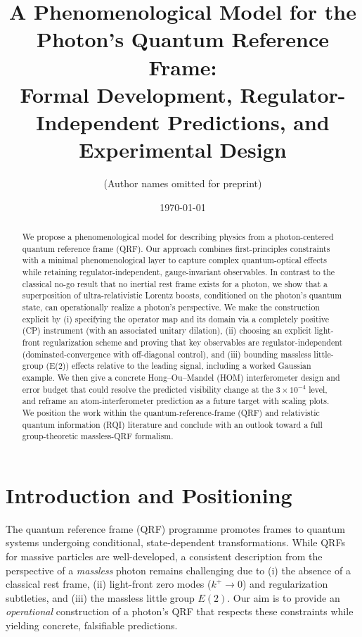 \documentclass[aps,11pt]{article}
\newcommand{\kplus}{k^{+}}
\begin{document}
\title{A Phenomenological Model for the Photon's Quantum Reference Frame:\\
Formal Development, Regulator-Independent Predictions, and Experimental Design}

\author{(Author names omitted for preprint)}
\date{\today}
\maketitle

\begin{abstract}
We propose a phenomenological model for describing physics from a photon-centered quantum reference frame (QRF). Our approach combines first-principles constraints with a minimal phenomenological layer to capture complex quantum-optical effects while retaining regulator-independent, gauge-invariant observables. In contrast to the classical no-go result that no inertial rest frame exists for a photon, we show that a superposition of ultra-relativistic Lorentz boosts, conditioned on the photon's quantum state, can operationally realize a photon's perspective. We make the construction explicit by (i) specifying the operator map and its domain via a completely positive (CP) instrument (with an associated unitary dilation), (ii) choosing an explicit light-front regularization scheme and proving that key observables are regulator-independent (dominated-convergence with off-diagonal control), and (iii) bounding massless little-group (E(2)) effects relative to the leading signal, including a worked Gaussian example. We then give a concrete Hong--Ou--Mandel (HOM) interferometer design and error budget that could resolve the predicted visibility change at the $3\times 10^{-4}$ level, and reframe an atom-interferometer prediction as a future target with scaling plots. We position the work within the quantum-reference-frame (QRF) and relativistic quantum information (RQI) literature and conclude with an outlook toward a full group-theoretic massless-QRF formalism.
\end{abstract}

\section{Introduction and Positioning}\label{sec:intro}
The quantum reference frame (QRF) programme promotes frames to quantum systems undergoing conditional, state-dependent transformations. While QRFs for massive particles are well-developed, a consistent description from the perspective of a \emph{massless} photon remains challenging due to (i) the absence of a classical rest frame, (ii) light-front zero modes (\(\kplus\!\to0\)) and regularization subtleties, and (iii) the massless little group \(E(2)\). Our aim is to provide an \emph{operational} construction of a photon's QRF that respects these constraints while yielding concrete, falsifiable predictions.
\end{document}
